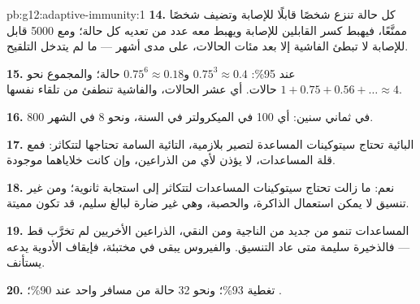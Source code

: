 \begin{solution}{pb:g12:adaptive-immunity:1}
\textbf{14.} كل حالة تنزع شخصًا قابلًا للإصابة وتضيف شخصًا ممنَّعًا،
فيهبط كسر القابلين للإصابة ويهبط معه عدد من تعديه كل حالة؛ ومع 5000
قابل للإصابة لا تبطئ الفاشية إلا بعد مئات الحالات، على مدى أشهر ---
ما لم يتدخل التلقيح.

\textbf{15.} عند 95\%: $0.75^3 \approx 0.4$ و$0.75^6 \approx 0.18$
حالة؛ والمجموع نحو $1 + 0.75 + 0.56 + \dots \approx 4$ حالات. أي عشر
الحالات، والفاشية تنطفئ من تلقاء نفسها.

\textbf{16.} 800 في ثماني سنين: أي 100 في الميكرولتر في السنة، ونحو 8
في الشهر.

\textbf{17.}  البائية تحتاج سيتوكينات  المساعدة لتصير
 بلازمية،  التائية السامة تحتاجها لتتكاثر: فمع قلة
المساعدات، لا يؤذن لأي من الذراعين، وإن كانت خلاياهما موجودة.

\textbf{18.} نعم:  ما زالت تحتاج سيتوكينات المساعدات
لتتكاثر إلى استجابة ثانوية؛ ومن غير تنسيق لا يمكن استعمال الذاكرة،
والحصبة، وهي غير ضارة لبالغ سليم، قد تكون مميتة.

\textbf{19.}  المساعدات تنمو من جديد من  الناجية ومن
النقي،  الذراعين الأخريين لم تخرَّب قط --- فالذخيرة سليمة
متى عاد التنسيق. والفيروس يبقى في  مختبئة، فإيقاف الأدوية يدعه
يستأنف.

\textbf{20.} تغطية 93\%؛ ونحو 32 حالة من مسافر واحد عند 90\%؛ .
\end{solution}
